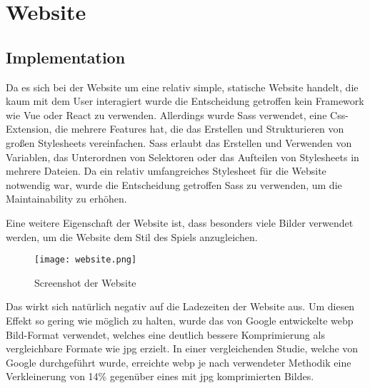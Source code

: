 
\section{Website}\label{sec:website}

\renewcommand{\kapitelautor}{Autor: Irgendwer} %

%
%

\subsection{Implementation}
\renewcommand{\kapitelautor}{Autor: Marvin Kurka}

Da es sich bei der Website um eine relativ simple, statische Website handelt, die kaum mit dem User interagiert wurde
die Entscheidung getroffen kein Framework wie \zB Vue oder React zu verwenden.
Allerdings wurde Sass verwendet, eine Css-Extension, die mehrere Features hat, die das Erstellen und Strukturieren
von großen Stylesheets vereinfachen.
Sass erlaubt \zB das Erstellen und Verwenden von Variablen, das Unterordnen von Selektoren oder das Aufteilen von
Stylesheets in mehrere Dateien.\cite{sassDoc}
Da ein relativ umfangreiches Stylesheet für die Website notwendig war, wurde die Entscheidung getroffen Sass zu
verwenden, um die Maintainability zu erhöhen.

Eine weitere Eigenschaft der \FF Website ist, dass besonders viele Bilder verwendet werden, um die Website dem Stil des
Spiels anzugleichen.

\begin{figure}[H]
    \centering
    \texttt{[image: website.png]}
    \caption{Screenshot der Website}
\end{figure}

Das wirkt sich natürlich negativ auf die Ladezeiten der Website aus.
Um diesen Effekt so gering wie möglich zu halten, wurde das von Google entwickelte webp Bild-Format verwendet, welches
eine deutlich bessere Komprimierung als vergleichbare Formate wie \zB jpg erzielt.
In einer vergleichenden Studie, welche von Google durchgeführt wurde, erreichte webp je nach verwendeter Methodik eine
Verkleinerung von 14\% gegenüber eines mit jpg komprimierten Bildes.\cite{googleWebpStudie}

\renewcommand{\kapitelautor}{}
